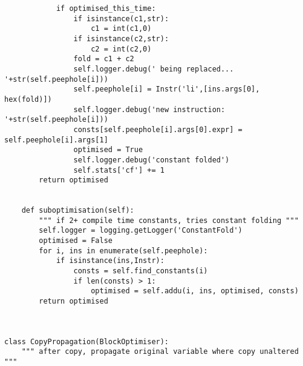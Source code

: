 \begin{lstlisting}
            if optimised_this_time:
                if isinstance(c1,str):
                    c1 = int(c1,0)
                if isinstance(c2,str):
                    c2 = int(c2,0)
                fold = c1 + c2 
                self.logger.debug(' being replaced... '+str(self.peephole[i]))
                self.peephole[i] = Instr('li',[ins.args[0], hex(fold)])
                self.logger.debug('new instruction: '+str(self.peephole[i]))
                consts[self.peephole[i].args[0].expr] = self.peephole[i].args[1]
                optimised = True
                self.logger.debug('constant folded')
                self.stats['cf'] += 1
        return optimised


    def suboptimisation(self):
        """ if 2+ compile time constants, tries constant folding """
        self.logger = logging.getLogger('ConstantFold')
        optimised = False
        for i, ins in enumerate(self.peephole):
            if isinstance(ins,Instr):
                consts = self.find_constants(i)
                if len(consts) > 1:
                    optimised = self.addu(i, ins, optimised, consts)
        return optimised



class CopyPropagation(BlockOptimiser):
    """ after copy, propagate original variable where copy unaltered """


\end{lstlisting}
